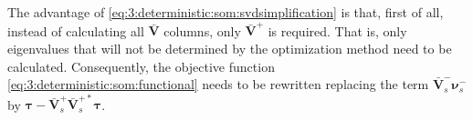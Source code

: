 			The advantage of \eqref{eq:3:deterministic:som:svdsimplification} is that, first of all, instead of calculating all $\mathbf{\bar{V}}$ columns, only $\mathbf{\bar{V}}^+$ is required. That is, only eigenvalues that will not be determined by the optimization method need to be calculated. Consequently, the objective function \eqref{eq:3:deterministic:som:functional} needs to be rewritten replacing the term $\mathbf{\bar{V}}^-_s\boldsymbol{\nu}^-_s$ by $\boldsymbol{\tau}-\mathbf{\bar{V}}^+_s\mathbf{\bar{V}}^{+*}_s\boldsymbol{\tau}$.
			
